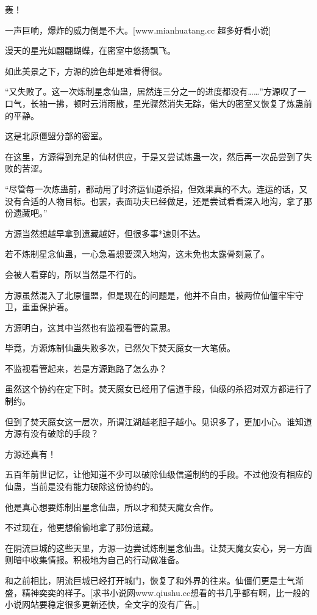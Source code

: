 
\begin{this_body}

轰！

一声巨响，爆炸的威力倒是不大。[www.mianhuatang.cc 超多好看小说]

漫天的星光如翩翩蝴蝶，在密室中悠扬飘飞。

如此美景之下，方源的脸色却是难看得很。

“又失败了。这一次炼制星念仙蛊，居然连三分之一的进度都没有……”方源叹了一口气，长袖一拂，顿时云消雨散，星光骤然消失无踪，偌大的密室又恢复了炼蛊前的平静。

这是北原僵盟分部的密室。

在这里，方源得到充足的仙材供应，于是又尝试炼蛊一次，然后再一次品尝到了失败的苦涩。

“尽管每一次炼蛊前，都动用了时济运仙道杀招，但效果真的不大。连运的话，又没有合适的人物目标。也罢，表面功夫已经做足，还是尝试看看深入地沟，拿了那份遗藏吧。”

方源当然想越早拿到遗藏越好，但很多事*速则不达。

若不炼制星念仙蛊，一心急着想要深入地沟，这未免也太露骨刻意了。

会被人看穿的，所以当然是不行的。

方源虽然混入了北原僵盟，但是现在的问题是，他并不自由，被两位仙僵牢牢守卫，重重保护着。

方源明白，这其中当然也有监视看管的意思。

毕竟，方源炼制仙蛊失败多次，已然欠下焚天魔女一大笔债。

不监视看管起来，若是方源跑路了怎么办？

虽然这个协约在定下时。焚天魔女已经用了信道手段，仙级的杀招对双方都进行了制约。

但到了焚天魔女这一层次，所谓江湖越老胆子越小。见识多了，更加小心。谁知道方源有没有破除的手段？

方源还真有！

五百年前世记忆，让他知道不少可以破除仙级信道制约的手段。不过他没有相应的仙蛊，当前是没有能力破除这份协约的。

他是真心想要炼制出星念仙蛊，所以才和焚天魔女合作。

不过现在，他更想偷偷地拿了那份遗藏。

在阴流巨城的这些天里，方源一边尝试炼制星念仙蛊。让焚天魔女安心，另一方面则暗中收集情报。积极地为自己的行动做准备。

和之前相比，阴流巨城已经打开城门，恢复了和外界的往来。仙僵们更是士气渐盛，精神奕奕的样子。[求书小说网www.qiushu.cc想看的书几乎都有啊，比一般的小说网站要稳定很多更新还快，全文字的没有广告。]


\end{this_body}
